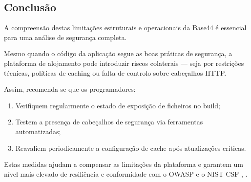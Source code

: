 \subsection{Conclusão}

A compreensão destas limitações estruturais e operacionais da Base44 é essencial para uma análise de segurança completa.

Mesmo quando o código da aplicação segue as boas práticas de segurança, a plataforma de alojamento pode introduzir riscos colaterais — seja por restrições técnicas, políticas de caching ou falta de controlo sobre cabeçalhos HTTP.

Assim, recomenda-se que os programadores:

\begin{enumerate}

    \item Verifiquem regularmente o estado de exposição de ficheiros no build;

    \item Testem a presença de cabeçalhos de segurança via ferramentas automatizadas;

    \item Reavaliem periodicamente a configuração de cache após atualizações críticas.

\end{enumerate}

Estas medidas ajudam a compensar as limitações da plataforma e garantem um nível mais elevado de resiliência e conformidade com o OWASP e o NIST CSF \cite{ref2}, \cite{ref18}.
